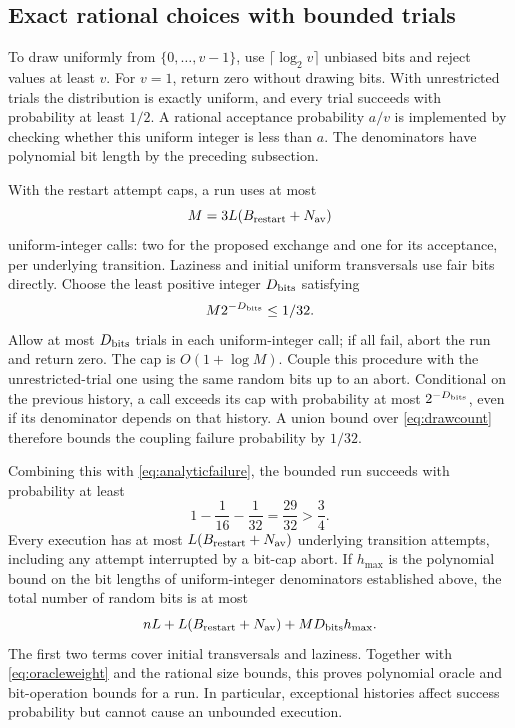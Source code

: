 \documentclass[11pt]{article}
\theoremstyle{definition}
\begin{document}
\subsection{Exact rational choices with bounded trials}

To draw uniformly from $\{0,\ldots,v-1\}$, use
$\lceil\log_2v\rceil$ unbiased bits and reject values at least $v$.
For $v=1$, return zero without drawing bits.  With unrestricted trials
the distribution is exactly uniform, and every trial succeeds with
probability at least $1/2$.  A rational acceptance probability $a/v$
is implemented by checking whether this uniform integer is less than
$a$.  The denominators have polynomial bit length by the preceding
subsection.

With the restart attempt caps, a run uses at most
\begin{equation}\label{eq:drawcount}
 M=3L(B_{\rm restart}+N_{\rm av})
\end{equation}
uniform-integer calls: two for the proposed exchange and one for its
acceptance, per underlying transition.  Laziness and initial uniform
transversals use fair bits directly.  Choose the least positive integer
$D_{\rm bits}$ satisfying
\begin{equation}\label{eq:bitcap}
 M2^{-D_{\rm bits}}\le1/32.
\end{equation}
Allow at most $D_{\rm bits}$ trials in each uniform-integer call; if all
fail, abort the run and return zero.  The cap is
$O(1+\log M)$.  Couple this procedure with the unrestricted-trial one
using the same random bits up to an abort.  Conditional on the previous
history, a call exceeds its cap with probability at most
$2^{-D_{\rm bits}}$, even if its denominator depends on that history.
A union bound over \eqref{eq:drawcount} therefore bounds the coupling
failure probability by $1/32$.

Combining this with \eqref{eq:analyticfailure}, the bounded run succeeds
with probability at least
\begin{equation}\label{eq:runsuccess}
 1-\frac1{16}-\frac1{32}=\frac{29}{32}>\frac34.
\end{equation}
Every execution has at most $L(B_{\rm restart}+N_{\rm av})$ underlying
transition attempts, including any attempt interrupted by a bit-cap
abort.  If $h_{\max}$ is the polynomial bound on the bit lengths of
uniform-integer denominators established above, the total number of
random bits is at most
\[
 nL+L(B_{\rm restart}+N_{\rm av})+MD_{\rm bits}h_{\max}.
\]
The first two terms cover initial transversals and laziness.  Together
with \eqref{eq:oracleweight} and the rational size bounds, this proves
polynomial oracle and bit-operation bounds for a run.  In particular,
exceptional histories affect success probability but cannot cause an
unbounded execution.
\end{document}
